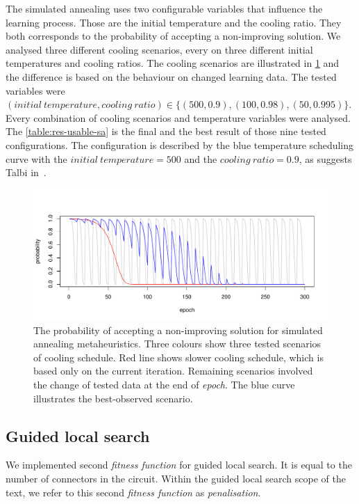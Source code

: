 \documentclass[
    digital,    %
    oneside,    %
    color,
    11pt,
    nocover,
    notable,
    nolof,
    nolot,
]{fithesis3}
\begin{document}
The simulated annealing uses two configurable variables that influence the learning process. Those are the initial temperature and the cooling ratio. They both corresponds to the probability of accepting a non-improving solution. We analysed three different cooling scenarios, every on three different initial temperatures and cooling ratios. The cooling scenarios are illustrated in \cref{fig:sa-cooling-scenarios} and the difference is based on the behaviour on changed learning data. The tested variables were $(\mathit{initial~temperature, cooling~ratio}) \in \{ (500, 0.9), (100, 0.98), (50, 0.995) \}$. Every combination of cooling scenarios and temperature variables were analysed. The \cref{table:res-usable-sa} is the final and the best result of those nine tested configurations. The configuration is described by the blue temperature scheduling curve with the $\mathit{initial~temperature} = 500$ and the $\mathit{cooling~ratio} = 0.9$, as suggests Talbi in~\cite{talbi2009metaheuristics}.

\begin{figure}
\centering
    \includegraphics[width=\textwidth]{./graphics/sa_prob}
    \caption{The probability of accepting a non-improving solution for simulated annealing metaheuristics. Three colours show three tested scenarios of cooling schedule. Red line shows slower cooling schedule, which is based only on the current iteration. Remaining scenarios involved the change of tested data at the end of \textit{epoch}. The blue curve illustrates the best-observed scenario.}
\label{fig:sa-cooling-scenarios}
\end{figure}

\subsection{Guided local search}
\label{subsec:res-ss-gls}

We implemented second \textit{fitness function} for guided local search. It is equal to the number of connectors in the circuit. Within the guided local search scope of the text, we refer to this second \textit{fitness function} as \textit{penalisation}.
\end{document}
